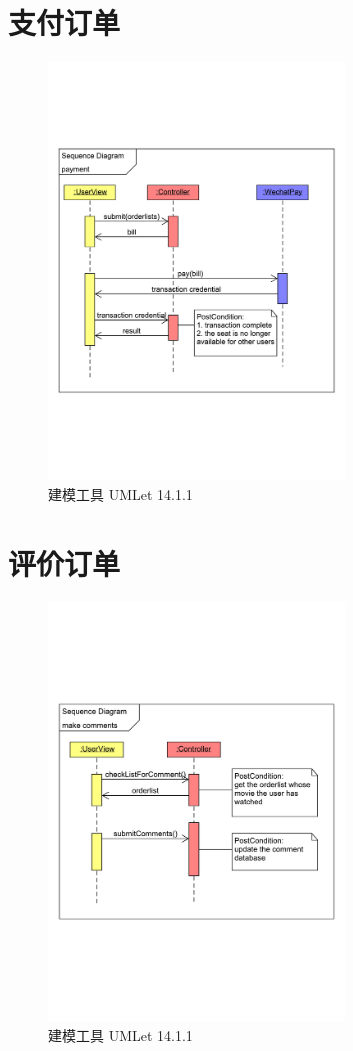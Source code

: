 \documentclass[a4paper]{article}
\begin{document}
  \section{支付订单}
    \begin{figure}[H]
      \centering
      \includegraphics[width=0.7\textwidth]{sequence_2.pdf}
      \caption{建模工具 UMLet 14.1.1}
    \end{figure}
  \section{评价订单}
    \begin{figure}[H]
      \centering
      \includegraphics[width=0.7\textwidth]{sequence_3.pdf}
      \caption{建模工具 UMLet 14.1.1}
    \end{figure}
\end{document}
